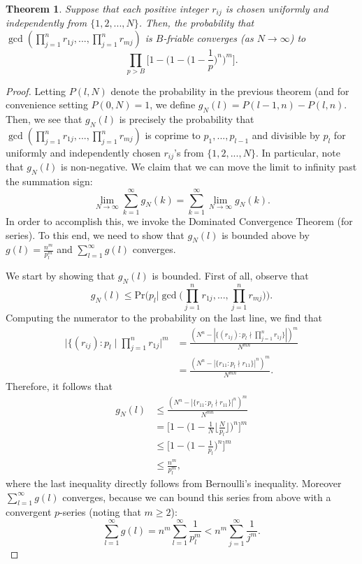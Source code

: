 \documentclass[12pt]{amsart}
\newtheorem{theorem}{Theorem}[subsection]
\theoremstyle{definition}
\begin{document}
\begin{theorem} Suppose that each positive integer $r_{ij}$ is chosen uniformly and independently from $\{1, 2, ..., N\}$. Then, the probability that $\gcd(\prod_{j=1}^n r_{1j}, ... , \prod_{j=1}^n r_{mj})$ is $B$-friable converges (as $N \to \infty$) to
	$$\prod_{p>B} \Big[1 - \Big(1 - \Big(1 - \frac{1}{p}\Big)^n \Big)^m \Big].$$
\end{theorem}

\begin{proof}
	Letting $P(l, N)$ denote the probability in the previous theorem (and for convenience setting $P(0, N) = 1$, we define $g_N(l) = P(l-1, n) - P(l, n)$. Then, we see that $g_N(l)$ is precisely the probability that $\gcd(\prod_{j=1}^n r_{1j}, ... , \prod_{j=1}^n r_{mj})$ is coprime to $p_1, ..., p_{l-1}$ and divisible by $p_l$ for uniformly and independently chosen $r_{ij}$'s from $\{1, 2, ..., N\}$. In particular, note that $g_N(l)$ is non-negative. We claim that we can move the limit to infinity past the summation sign:
	$$\lim_{N \to \infty} \sum_{k=1}^{\infty} g_N(k) = \sum_{k=1}^{\infty} \lim_{N \to \infty} g_N(k).$$
	In order to accomplish this, we invoke the Dominated Convergence Theorem (for series). To this end, we need to show that $g_N(l)$ is bounded above by $g(l) = \frac{n^m}{p_l^m}$ and $\sum_{l=1}^{\infty} g(l)$ converges.
	
	We start by showing that $g_N(l)$ is bounded. First of all, observe that
	$$g_N(l) \leq \text{Pr}\Big(p_l \Big| \gcd\Big(\prod_{j=1}^n r_{1j}, ... , \prod_{j=1}^n r_{mj}\Big)\Big).$$
	Computing the numerator to the probability on the last line, we find that
	\begin{align*} 
		\Big|\{(r_{ij}) : p_l \mid \prod_{j=1}^n r_{1j}\Big|^m &= \frac{(N^n - |\{(r_{1j}) : p_l \nmid \prod_{j=1}^n r_{1j}\}|)^m}{N^{mn}}\\
		&= \frac{(N^n - |\{r_{11} : p_l \nmid r_{11}\}|^n)^m}{N^{mn}}. \end{align*}
	Therefore, it follows that
	\begin{align*} 
		g_N(l) &\leq \frac{(N^n - |\{r_{11} : p_l \nmid r_{11}\}|^n)^m}{N^{mn}}\\
		&= \Big[1 - \Big(1 - \frac{1}{N} \Big\lfloor \frac{N}{p_l}\Big\rfloor\Big)^n\Big]^m\\
		&\leq \Big[1 - \Big(1 - \frac{1}{p_l}\Big)^n\Big]^m\\
		&\leq \frac{n^m}{p_l^m},\end{align*}
	where the last inequality directly follows from Bernoulli's inequality. Moreover $\sum_{l=1}^{\infty} g(l)$ converges, because we can bound this series from above with a convergent $p$-series (noting that $m \geq 2$):
	$$\sum_{l=1}^{\infty} g(l) = n^m \sum_{l=1}^{\infty} \frac{1}{p_l^m} < n^m \sum_{j=1}^{\infty} \frac{1}{j^m}.$$
	

\end{proof}
\end{document}
